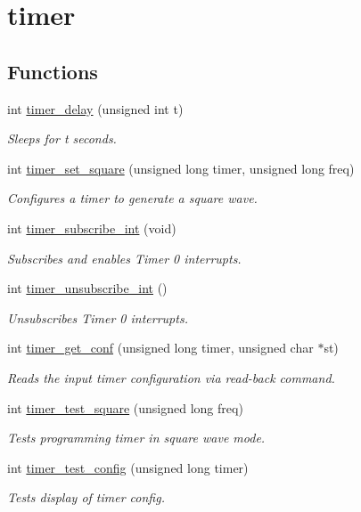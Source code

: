 \hypertarget{group__timer}{}\section{timer}
\label{group__timer}
\subsection*{Functions}
\begin{DoxyCompactItemize}
\item 
int \hyperlink{group__timer_ga7487d2df58374e7945748561966a03fb}{timer\+\_\+delay} (unsigned int t)
\begin{DoxyCompactList}\small\item\em Sleeps for t seconds. \end{DoxyCompactList}\item 
int \hyperlink{group__timer_gada4efbb5c88275795526fc45f0814aa3}{timer\+\_\+set\+\_\+square} (unsigned long timer, unsigned long freq)
\begin{DoxyCompactList}\small\item\em Configures a timer to generate a square wave. \end{DoxyCompactList}\item 
int \hyperlink{group__timer_ga4c5d9f47323eda494cfd826f6d62eec9}{timer\+\_\+subscribe\+\_\+int} (void)
\begin{DoxyCompactList}\small\item\em Subscribes and enables Timer 0 interrupts. \end{DoxyCompactList}\item 
int \hyperlink{group__timer_gab9eea51549744bca5c5c923b388bb4ee}{timer\+\_\+unsubscribe\+\_\+int} ()
\begin{DoxyCompactList}\small\item\em Unsubscribes Timer 0 interrupts. \end{DoxyCompactList}\item 
int \hyperlink{group__timer_ga8eb3357bc05265afc4bea5bbbb480a53}{timer\+\_\+get\+\_\+conf} (unsigned long timer, unsigned char $\ast$st)
\begin{DoxyCompactList}\small\item\em Reads the input timer configuration via read-\/back command. \end{DoxyCompactList}\item 
int \hyperlink{group__timer_ga2e596aede5a7bfc4a6f4382779bf0d7d}{timer\+\_\+test\+\_\+square} (unsigned long freq)
\begin{DoxyCompactList}\small\item\em Tests programming timer in square wave mode. \end{DoxyCompactList}\item 
int \hyperlink{group__timer_ga363e72d1c055d859746cb3305a68af6d}{timer\+\_\+test\+\_\+config} (unsigned long timer)
\begin{DoxyCompactList}\small\item\em Tests display of timer config. \end{DoxyCompactList}\end{DoxyCompactItemize}



